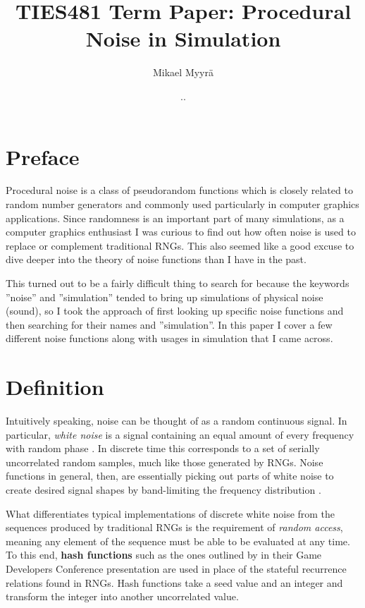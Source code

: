 \documentclass{article}
\title{TIES481 Term Paper: Procedural Noise in Simulation}
\author{Mikael Myyrä}
\date{\number\day.\number\month.\number\year}
\begin{document}
\maketitle

\section*{Preface}

Procedural noise is a class of pseudorandom functions which is closely related
to random number generators and commonly used particularly in computer graphics
applications. Since randomness is an important part of many simulations, as a
computer graphics enthusiast I was curious to find out how often noise is used
to replace or complement traditional RNGs. This also seemed like a good excuse
to dive deeper into the theory of noise functions than I have in the past.

This turned out to be a fairly difficult thing to search for because the
keywords ''noise'' and ''simulation'' tended to bring up simulations of
physical noise (sound), so I took the approach of first looking up specific
noise functions and then searching for their names and ''simulation''.
In this paper I cover a few different noise functions along with
usages in simulation that I came across.

\section*{Definition}

Intuitively speaking, noise can be thought of as a random continuous signal.
In particular, \textit{white noise} is a signal containing an equal amount of
every frequency with random phase \parencite{lagae_survey_2010}. In discrete
time this corresponds to a set of serially uncorrelated random samples, much
like those generated by RNGs. Noise functions in general, then, are essentially
picking out parts of white noise to create desired signal shapes by
band-limiting the frequency distribution \parencite{lagae_survey_2010}.

What differentiates typical implementations of discrete white noise from the
sequences produced by traditional RNGs is the requirement of \textit{random
access}, meaning any element of the sequence must be able to be evaluated at
any time. To this end, \textbf{hash functions} such as the ones outlined by
\citeauthor{eiserloh_noise-based_2017} in their Game Developers Conference
presentation \parencite*{eiserloh_noise-based_2017} are used in place of the
stateful recurrence relations found in RNGs. Hash functions take a seed value
and an integer and transform the integer into another uncorrelated value.
\end{document}
